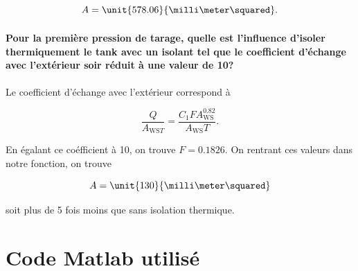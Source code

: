 $$A = \unit{578.06}{\milli\meter\squared}.$$

\paragraph{Pour la première pression de tarage, quelle est l'influence
d'isoler thermiquement le tank avec un isolant tel que le coefficient
d'échange avec l'extérieur soir réduit à une valeur de
\unit{10}{\watt\per\meter\squared\kelvin}?}
Le coefficient d'échange avec l'extérieur correspond à

$$\frac{Q}{A_{\text{WS}T}} = \frac{C_1FA_{\text{WS}}^{0.82}}{A_{\text{WS}}T}.$$

En égalant ce coéfficient à 10, on trouve $F = 0.1826$.
On rentrant ces valeurs dans notre fonction, on trouve 

$$A = \unit{130}{\milli\meter\squared}$$

soit plus de 5 fois moins que sans isolation thermique.

\appendix
\section{Code Matlab utilisé}
\label{code-matlab}

